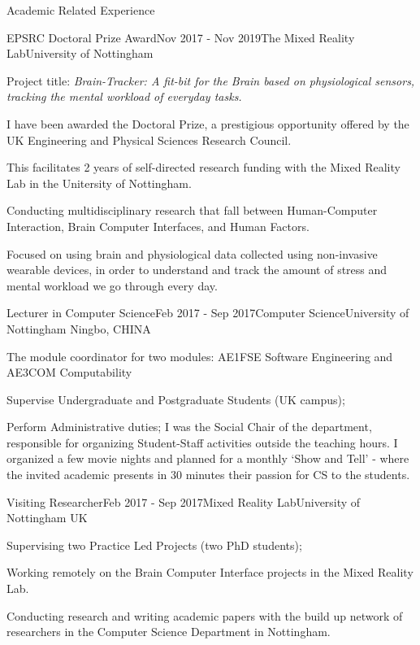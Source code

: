 \documentclass{resume} %
\begin{document}
\begin{rSection}{Academic Related Experience}
	
	\begin{rSubsection}{EPSRC Doctoral Prize Award}{Nov 2017 - Nov 2019}{The Mixed Reality Lab}{University of Nottingham }
		\item Project title: \textit{Brain-Tracker: A fit-bit for the Brain based on physiological sensors, tracking the mental workload of everyday tasks.}
		\item I have been awarded the Doctoral Prize, a prestigious opportunity offered by the UK Engineering and Physical Sciences Research Council.
		\item This facilitates 2 years of self-directed research funding with the Mixed Reality Lab in the Unitersity of Nottingham.
		\item Conducting multidisciplinary research that fall between Human-Computer Interaction, Brain Computer Interfaces, and Human Factors.
		\item  Focused on using brain and physiological data collected using non-invasive wearable devices, in order to understand and track the amount of stress and mental workload we go through every day.
		
	\end{rSubsection}
	
	\begin{rSubsection}{Lecturer in Computer Science}{Feb 2017 - Sep 2017}{Computer Science}{University of Nottingham Ningbo, CHINA}
			\item The module coordinator for two modules: AE1FSE Software Engineering and AE3COM Computability
			\item Supervise Undergraduate and Postgraduate Students (UK campus);
			\item Perform Administrative duties; I was the Social Chair of the department, responsible for organizing Student-Staff activities outside the teaching hours. I organized a few movie nights and planned for a monthly `Show and Tell' - where the invited academic presents in 30 minutes their passion for CS to the students.
	\end{rSubsection}
	
	\begin{rSubsection}{Visiting Researcher}{Feb 2017 - Sep 2017}{Mixed Reality Lab}{University of Nottingham UK}
		\item Supervising two Practice Led Projects (two PhD students);
		\item Working remotely on the Brain Computer Interface projects in the Mixed Reality Lab.
		\item Conducting research and writing academic papers with the build up network of researchers in the Computer Science Department in Nottingham.		
	\end{rSubsection}
	

\end{rSection}
\end{document}
